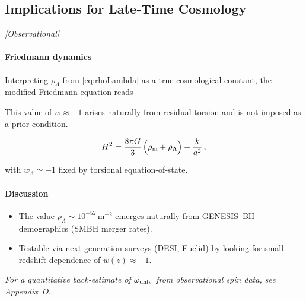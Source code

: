 \documentclass{article}
\newcommand{\obstag}{\textcolor{green!60!black}{\textit{[Observational]}}}
\begin{document}
\subsection{Implications for Late‐Time Cosmology}
\label{sec:late-cosmo}
\obstag

\paragraph{Friedmann dynamics}
Interpreting $\rho_\Lambda$ from \eqref{eq:rhoLambda} as a true cosmological constant, the modified Friedmann equation reads

This value of \(w \approx -1\) arises naturally from residual torsion and is not imposed as a prior condition.


\begin{equation}
  H^2
  = \frac{8\pi G}{3}\,\Bigl(\rho_{\rm m} + \rho_\Lambda\Bigr)
  + \frac{k}{a^2}\,,
\end{equation}

with $w_\Lambda\simeq-1$ fixed by torsional equation‐of‐state.

\paragraph{Discussion}
\begin{itemize}
  \item The value $\rho_\Lambda\sim10^{-52}\,\mathrm m^{-2}$ emerges naturally from GENESIS–BH demographics (SMBH merger rates).  
  \item Testable via next‐generation surveys (DESI, Euclid) by looking for small redshift‐dependence of $w(z)\approx-1$.  
\end{itemize}

\medskip
\begin{center}
\end{center}
\medskip

\vspace{0.5em}
\noindent
\textit{For a quantitative back-estimate of $\omega_{\rm univ}$ from observational spin data, see Appendix~O.}
\end{document}
